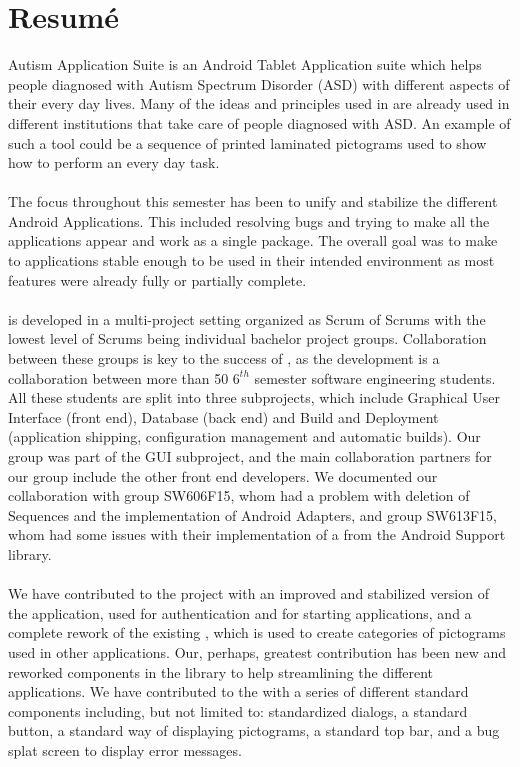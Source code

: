 \chapter{Resumé}
\giraf Autism Application Suite is an Android Tablet Application suite which helps people diagnosed with Autism Spectrum Disorder (ASD) with different aspects of their every day lives. Many of the ideas and principles used in \giraf are already used in different institutions that take care of people diagnosed with ASD. An example of such a tool could be a sequence of printed laminated pictograms used to show how to perform an every day task.
\\\\
The focus throughout this semester has been to unify and stabilize the different \giraf Android Applications. This included resolving bugs and trying to make all the applications appear and work as a single package. The overall goal was to make to applications stable enough to be used in their intended environment as most features were already fully or partially complete.  
\\\\
\giraf is developed in a multi-project setting organized as Scrum of Scrums with the lowest level of Scrums being individual bachelor project groups. Collaboration between these groups is key to the success of \giraf, as the development is a collaboration between more than 50 $6^{th}$ semester software engineering students. All these students are split into three subprojects, which include Graphical User Interface (front end), Database (back end) and Build and Deployment (application shipping, configuration management and automatic builds). Our group was part of the GUI subproject, and the main collaboration partners for our group include the other front end developers. We documented our collaboration with group SW606F15, whom had a problem with deletion of \giraf Sequences and the implementation of Android Adapters, and group SW613F15, whom had some issues with their implementation of a  from the Android Support library. 
\\\\
We have contributed to the project with an improved and stabilized version of the \giraf \launcher application, used for authentication and for starting \giraf applications, and a complete rework of the existing \giraf \ct, which is used to create categories of pictograms used in other applications. Our, perhaps, greatest contribution has been new and reworked components in the \gc library to help streamlining the different applications. We have contributed to the \gc with a series of different standard components including, but not limited to: standardized dialogs, a standard button, a standard way of displaying pictograms, a standard top bar, and a bug splat screen to display error messages.
